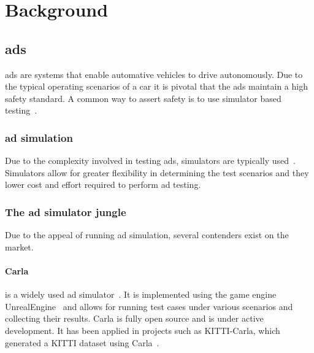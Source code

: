 \section{Background}


% 

\subsection{\acrfull{ads}}

\acrfull{ads} are systems that enable automative vehicles to drive autonomously. Due to the
typical operating scenarios of a car it is pivotal that the \acrlong{ads} maintain a high safety standard. A common way to assert safety
is to use simulator based testing~\cite[1]{DeepScenario}.

\subsubsection{\acrlong{ad} simulation}

Due to the complexity involved in testing \acrlong{ads}, simulators are
typically used~\cite{DeepScenario}. Simulators allow for greater flexibility in
determining the test scenarios and they lower cost and effort required to perform
\acrshort{ad} testing.

\subsubsection*{The \acrshort{ad} simulator jungle}\label{sec:simulatorOverview}

Due to the appeal of running \acrshort{ad} simulation, several contenders exist
on the market.

\paragraph{Carla} is a widely used \acrshort{ad} simulator~\cite{Carla}. It is implemented
using the game engine UnrealEngine~\cite{unrealengine} and allows for running
test cases under various scenarios and collecting their results. Carla is fully
open source and is under active development. It has been applied in projects such as KITTI-Carla,
which generated a KITTI dataset using Carla~\cite{kittiCarla}.

